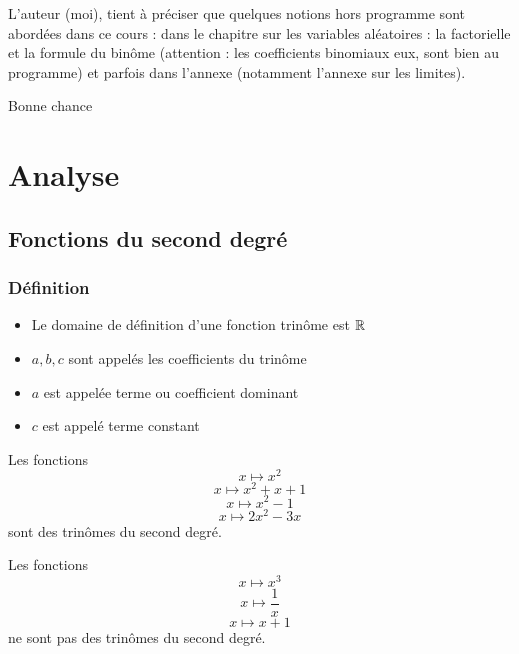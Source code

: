 L'auteur (moi), tient à préciser que quelques notions hors programme sont abordées dans ce cours : dans le chapitre sur les variables aléatoires : la factorielle et la formule du binôme (attention : les coefficients binomiaux eux, sont bien au programme) et parfois dans l'annexe (notamment l'annexe sur les limites).\newline

Bonne chance 
\part{Analyse}
\chapter{Fonctions du second degré}
\section{Définition}
\newline
\begin{remarques}
\begin{itemize}
\item Le domaine de définition d'une fonction trinôme est $\mathbb{R}$
\item $a,b,c$ sont appelés les coefficients du trinôme
\item $a$ est appelée terme ou coefficient dominant
\item $c$ est appelé terme constant
\end{itemize}
\end{remarques}
\begin{exemples}
Les fonctions $$x \mapsto x^2$$ $$x \mapsto x^2 + x + 1$$ $$x \mapsto x^2-1$$ $$x\mapsto 2x^2-3x$$ sont des trinômes du second degré. \newline \newline

Les fonctions $$x \mapsto x^3$$ $$x \mapsto \dfrac{1}{x}$$ $$x \mapsto x+1$$ ne sont pas des trinômes du second degré.
\end{exemples}
